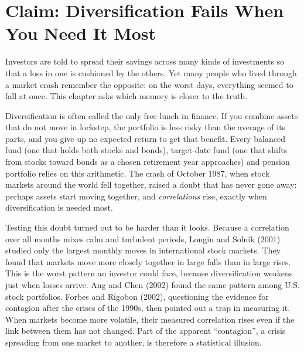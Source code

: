 \makeatletter
{}
\makeatother

\makeatletter
\makeatother

\chapter{Claim: Diversification Fails When You Need It Most}
\label{ch:10}
\providecommand{\term}[1]{\emph{#1}}

Investors are told to spread their savings across many kinds of investments so that a loss in one is cushioned by the others. Yet many people who lived through a market crash remember the opposite: on the worst days, everything seemed to fall at once. This chapter asks which memory is closer to the truth.

Diversification is often called the only free lunch in finance. If you combine assets that do not move in lockstep, the portfolio is less risky than the average of its parts, and you give up no expected return to get that benefit. Every balanced fund (one that holds both stocks and bonds), target-date fund (one that shifts from stocks toward bonds as a chosen retirement year approaches) and pension portfolio relies on this arithmetic. The crash of October 1987, when stock markets around the world fell together, raised a doubt that has never gone away: perhaps assets start moving together, and \term{correlations} rise, exactly when diversification is needed most.

Testing this doubt turned out to be harder than it looks. Because a correlation over all months mixes calm and turbulent periods, Longin and Solnik (2001) studied only the largest monthly moves in international stock markets. They found that markets move more closely together in large falls than in large rises. This is the worst pattern an investor could face, because diversification weakens just when losses arrive. Ang and Chen (2002) found the same pattern among U.S. stock portfolios. Forbes and Rigobon (2002), questioning the evidence for contagion after the crises of the 1990s, then pointed out a trap in measuring it. When markets become more volatile, their measured correlation rises even if the link between them has not changed. Part of the apparent ``contagion'', a crisis spreading from one market to another, is therefore a statistical illusion.

